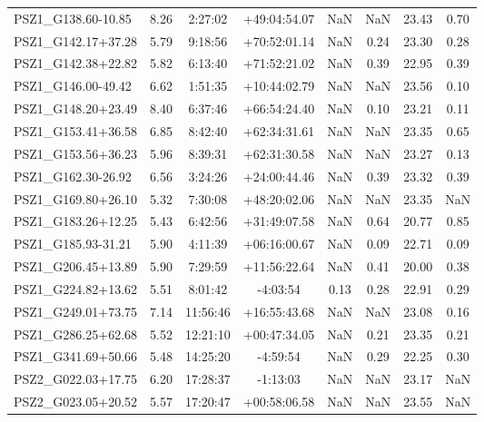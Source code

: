 \documentclass[apj, revtex4]{emulateapj}
\begin{document}
\begin{longtable*}{lccccccc}
    PSZ1\_G138.60-10.85 &  8.26 &   2:27:02 &  +49:04:54.07 &         NaN &    NaN &   23.43 &      0.70 \\
    PSZ1\_G142.17+37.28 &  5.79 &   9:18:56 &  +70:52:01.14 &         NaN &   0.24 &   23.30 &      0.28 \\
    PSZ1\_G142.38+22.82 &  5.82 &   6:13:40 &  +71:52:21.02 &         NaN &   0.39 &   22.95 &      0.39 \\
    PSZ1\_G146.00-49.42 &  6.62 &   1:51:35 &  +10:44:02.79 &         NaN &    NaN &   23.56 &      0.10 \\
    PSZ1\_G148.20+23.49 &  8.40 &   6:37:46 &  +66:54:24.40 &         NaN &   0.10 &   23.21 &      0.11 \\
    PSZ1\_G153.41+36.58 &  6.85 &   8:42:40 &  +62:34:31.61 &         NaN &    NaN &   23.35 &      0.65 \\
    PSZ1\_G153.56+36.23 &  5.96 &   8:39:31 &  +62:31:30.58 &         NaN &    NaN &   23.27 &      0.13 \\
    PSZ1\_G162.30-26.92 &  6.56 &   3:24:26 &  +24:00:44.46 &         NaN &   0.39 &   23.32 &      0.39 \\
    PSZ1\_G169.80+26.10 &  5.32 &   7:30:08 &  +48:20:02.06 &         NaN &    NaN &   23.35 &       NaN \\
    PSZ1\_G183.26+12.25 &  5.43 &   6:42:56 &  +31:49:07.58 &         NaN &   0.64 &   20.77 &      0.85 \\
    PSZ1\_G185.93-31.21 &  5.90 &   4:11:39 &  +06:16:00.67 &         NaN &   0.09 &   22.71 &      0.09 \\
    PSZ1\_G206.45+13.89 &  5.90 &   7:29:59 &  +11:56:22.64 &         NaN &   0.41 &   20.00 &      0.38 \\
    PSZ1\_G224.82+13.62 &  5.51 &   8:01:42 &      -4:03:54 &        0.13 &   0.28 &   22.91 &      0.29 \\
    PSZ1\_G249.01+73.75 &  7.14 &  11:56:46 &  +16:55:43.68 &         NaN &    NaN &   23.08 &      0.16 \\
    PSZ1\_G286.25+62.68 &  5.52 &  12:21:10 &  +00:47:34.05 &         NaN &   0.21 &   23.35 &      0.21 \\
    PSZ1\_G341.69+50.66 &  5.48 &  14:25:20 &      -4:59:54 &         NaN &   0.29 &   22.25 &      0.30 \\
    PSZ2\_G022.03+17.75 &  6.20 &  17:28:37 &      -1:13:03 &         NaN &    NaN &   23.17 &       NaN \\
    PSZ2\_G023.05+20.52 &  5.57 &  17:20:47 &  +00:58:06.58 &         NaN &    NaN &   23.55 &       NaN \\

\end{longtable*}
\end{document}

